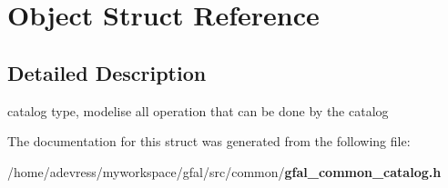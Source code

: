 \section{Object Struct Reference}
\label{structObject}


\subsection{Detailed Description}
catalog type, modelise all operation that can be done by the catalog 



The documentation for this struct was generated from the following file:\begin{CompactItemize}
\item 
/home/adevress/myworkspace/gfal/src/common/\bf{gfal\_\-common\_\-catalog.h}\end{CompactItemize}
